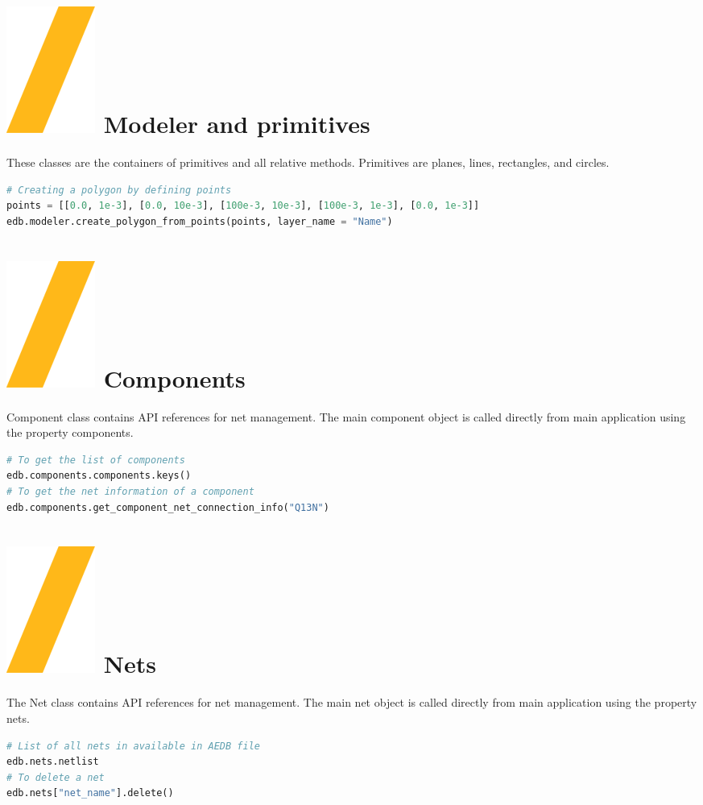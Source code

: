 \documentclass[landscape]{article}
\begin{document}
\begin{multicols}{3}
\section{\includegraphics[height=\fontcharht\font`\S]{slash.png} Modeler and primitives}
These classes are the containers of primitives and all relative methods. Primitives are planes, lines, rectangles, and circles.
\begin{lstlisting}[language=Python]
# Creating a polygon by defining points
points = [[0.0, 1e-3], [0.0, 10e-3], [100e-3, 10e-3], [100e-3, 1e-3], [0.0, 1e-3]]
edb.modeler.create_polygon_from_points(points, layer_name = "Name")
\end{lstlisting}
\section{\includegraphics[height=\fontcharht\font`\S]{slash.png} Components}
Component class contains API references for net management. The main component object is called directly from main application using the property components.
\begin{lstlisting}[language=Python]
# To get the list of components
edb.components.components.keys()
# To get the net information of a component
edb.components.get_component_net_connection_info("Q13N")
\end{lstlisting}
\section{\includegraphics[height=\fontcharht\font`\S]{slash.png} Nets}
The Net class contains API references for net management. The main net object is called directly from main application using the property nets.
\begin{lstlisting}[language=Python]
# List of all nets in available in AEDB file
edb.nets.netlist
# To delete a net
edb.nets["net_name"].delete()
\end{lstlisting}

\end{multicols}
\end{document}

